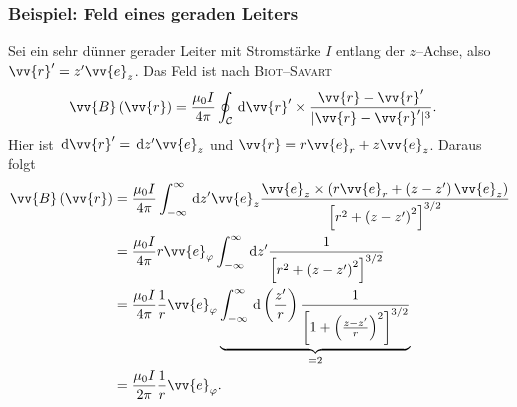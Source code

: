 \documentclass[a4paper,12pt]{article}
\newcommand{\td}{\,\text{d}}
\numberwithin{equation}{section}
\begin{document}
\subsubsection{Beispiel: Feld eines geraden Leiters}
Sei ein sehr dünner gerader Leiter mit Stromstärke $I$ entlang der $z$--Achse, also $\vv{r}'=z'\vv{e}_z$. Das Feld ist nach \textsc{Biot--Savart}
\begin{align} 
        \vv{B}\left(\vv{r}\right)&=\dfrac{\mu _0I}{4\pi }\oint_{\mathcal{C}}^{}\td \vv{r}'\times \dfrac{\vv{r}-\vv{r}'}{|\vv{r}-\vv{r}'|^3}
.\end{align} 
Hier ist $\td \vv{r}'=\td z'\vv{e}_z$ und $\vv{r}=r\vv{e}_r+z\vv{e}_z$. Daraus folgt
\begin{align} 
        \vv{B}\left(\vv{r}\right)&=\dfrac{\mu _0I}{4\pi }\int_{-\infty}^{\infty}\td z'\vv{e}_z \dfrac{\vv{e}_z\times \left(r\vv{e}_r+\left(z-z'\right)\vv{e}_z\right)}{\left[r^2+\left(z-z'\right)^2\right]^{3/2}}\\
                                 &=\dfrac{\mu _0I}{4\pi }r\vv{e}_\varphi \int_{-\infty}^{\infty}\td z'\dfrac{1}{\left[r^2+\left(z-z'\right)^2\right]^{3/2}}\\
                                 &=\dfrac{\mu _0I}{4\pi }\dfrac{1}{r}\vv{e}_\varphi \underbrace{\int_{-\infty}^{\infty}\td \left(\dfrac{z'}{r}\right)\dfrac{1}{\left[1+\left(\tfrac{z-z'}{r}\right)^2\right]^{3/2} }}_{=2}\\
                                 &=\dfrac{\mu _0I}{2\pi }\dfrac{1}{r}\vv{e}_\varphi 
.\end{align} 
\end{document}
